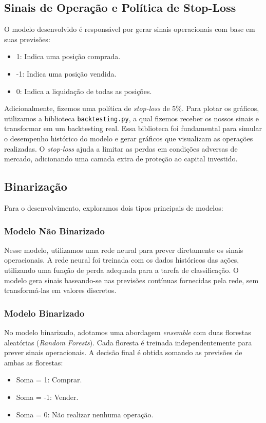 \documentclass{article}
\begin{document}
\subsection{Sinais de Operação e Política de Stop-Loss}

O modelo desenvolvido é responsável por gerar sinais operacionais com base em suas previsões:
\begin{itemize}
    \item 1: Indica uma posição comprada.
    \item -1: Indica uma posição vendida.
    \item 0: Indica a liquidação de todas as posições.
\end{itemize}

Adicionalmente, fizemos uma política de \textit{stop-loss} de 5\%. Para plotar os gráficos, utilizamos a biblioteca \texttt{backtesting.py}, a qual fizemos receber os nossos sinais e transformar em um backtesting real. Essa biblioteca foi fundamental para simular o desempenho histórico do modelo e gerar gráficos que visualizam as operações realizadas. O \textit{stop-loss} ajuda a limitar as perdas em condições adversas de mercado, adicionando uma camada extra de proteção ao capital investido.

\subsection{Binarização}

Para o desenvolvimento, exploramos dois tipos principais de modelos:

\subsubsection{Modelo Não Binarizado}

Nesse modelo, utilizamos uma rede neural para prever diretamente os sinais operacionais. A rede neural foi treinada com os dados históricos das ações, utilizando uma função de perda adequada para a tarefa de classificação. O modelo gera sinais baseando-se nas previsões contínuas fornecidas pela rede, sem transformá-las em valores discretos.

\subsubsection{Modelo Binarizado}

No modelo binarizado, adotamos uma abordagem \textit{ensemble} com duas florestas aleatórias (\textit{Random Forests}). Cada floresta é treinada independentemente para prever sinais operacionais. A decisão final é obtida somando as previsões de ambas as florestas:
\begin{itemize}
    \item Soma = 1: Comprar.
    \item Soma = -1: Vender.
    \item Soma = 0: Não realizar nenhuma operação.
\end{itemize}
\end{document}
